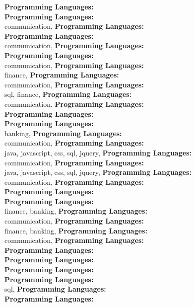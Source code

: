 \textbf{Programming Languages:} \\
\textbf{Programming Languages:} \\
communication, \textbf{Programming Languages:} \\
\textbf{Programming Languages:} \\
communication, \textbf{Programming Languages:} \\
\textbf{Programming Languages:} \\
communication, \textbf{Programming Languages:} \\
finance, \textbf{Programming Languages:} \\
communication, \textbf{Programming Languages:} \\
sql, finance, \textbf{Programming Languages:} \\
communication, \textbf{Programming Languages:} \\
\textbf{Programming Languages:} \\
\textbf{Programming Languages:} \\
banking, \textbf{Programming Languages:} \\
communication, \textbf{Programming Languages:} \\
java, javascript, css, sql, jquery, \textbf{Programming Languages:} \\
communication, \textbf{Programming Languages:} \\
java, javascript, css, sql, jquery, \textbf{Programming Languages:} \\
communication, \textbf{Programming Languages:} \\
\textbf{Programming Languages:} \\
\textbf{Programming Languages:} \\
finance, banking, \textbf{Programming Languages:} \\
communication, \textbf{Programming Languages:} \\
finance, banking, \textbf{Programming Languages:} \\
communication, \textbf{Programming Languages:} \\
\textbf{Programming Languages:} \\
\textbf{Programming Languages:} \\
\textbf{Programming Languages:} \\
\textbf{Programming Languages:} \\
sql, \textbf{Programming Languages:} \\
\textbf{Programming Languages:} \\
